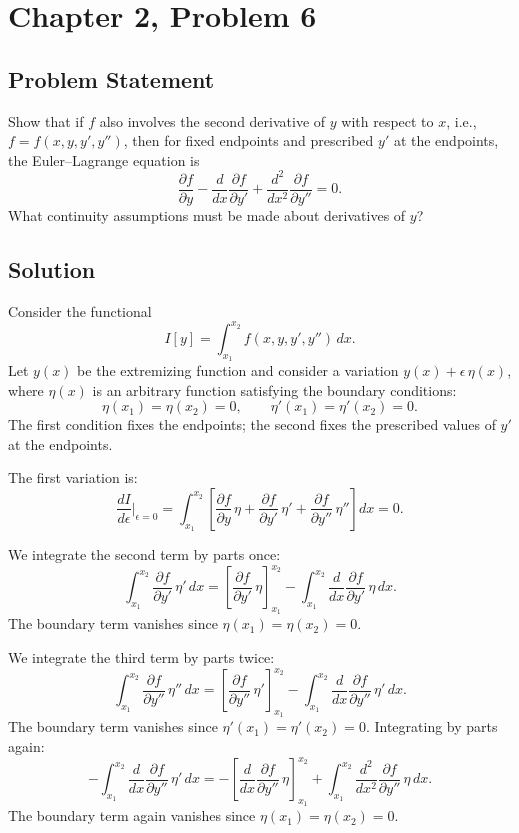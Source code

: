 \documentclass[12pt]{article}
\begin{document}
\section*{Chapter 2, Problem 6}

\subsection*{Problem Statement}
Show that if $f$ also involves the second derivative of $y$ with respect to $x$, i.e., $f = f(x, y, y', y'')$, then for fixed endpoints and prescribed $y'$ at the endpoints, the Euler--Lagrange equation is
\[
  \frac{\partial f}{\partial y} - \frac{d}{dx}\frac{\partial f}{\partial y'} + \frac{d^2}{dx^2}\frac{\partial f}{\partial y''} = 0.
\]
What continuity assumptions must be made about derivatives of $y$?

\subsection*{Solution}

Consider the functional
\[
  I[y] = \int_{x_1}^{x_2} f(x, y, y', y'')\,dx.
\]
Let $y(x)$ be the extremizing function and consider a variation $y(x) + \epsilon\,\eta(x)$, where $\eta(x)$ is an arbitrary function satisfying the boundary conditions:
\[
  \eta(x_1) = \eta(x_2) = 0, \qquad \eta'(x_1) = \eta'(x_2) = 0.
\]
The first condition fixes the endpoints; the second fixes the prescribed values of $y'$ at the endpoints.

The first variation is:
\[
  \frac{dI}{d\epsilon}\bigg|_{\epsilon=0}
  = \int_{x_1}^{x_2} \left[\frac{\partial f}{\partial y}\,\eta + \frac{\partial f}{\partial y'}\,\eta' + \frac{\partial f}{\partial y''}\,\eta''\right] dx = 0.
\]

We integrate the second term by parts once:
\[
  \int_{x_1}^{x_2} \frac{\partial f}{\partial y'}\,\eta'\,dx
  = \left[\frac{\partial f}{\partial y'}\,\eta\right]_{x_1}^{x_2}
  - \int_{x_1}^{x_2} \frac{d}{dx}\frac{\partial f}{\partial y'}\,\eta\,dx.
\]
The boundary term vanishes since $\eta(x_1) = \eta(x_2) = 0$.

We integrate the third term by parts twice:
\[
  \int_{x_1}^{x_2} \frac{\partial f}{\partial y''}\,\eta''\,dx
  = \left[\frac{\partial f}{\partial y''}\,\eta'\right]_{x_1}^{x_2}
  - \int_{x_1}^{x_2} \frac{d}{dx}\frac{\partial f}{\partial y''}\,\eta'\,dx.
\]
The boundary term vanishes since $\eta'(x_1) = \eta'(x_2) = 0$. Integrating by parts again:
\[
  -\int_{x_1}^{x_2} \frac{d}{dx}\frac{\partial f}{\partial y''}\,\eta'\,dx
  = -\left[\frac{d}{dx}\frac{\partial f}{\partial y''}\,\eta\right]_{x_1}^{x_2}
  + \int_{x_1}^{x_2} \frac{d^2}{dx^2}\frac{\partial f}{\partial y''}\,\eta\,dx.
\]
The boundary term again vanishes since $\eta(x_1) = \eta(x_2) = 0$.
\end{document}
